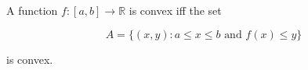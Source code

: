 A function $f: [a, b] \to \mathbb{R}$ is convex iff the set

$$A = \{(x, y): a \leq x \leq b \text{ and } f(x) \leq y\}$$

is convex.